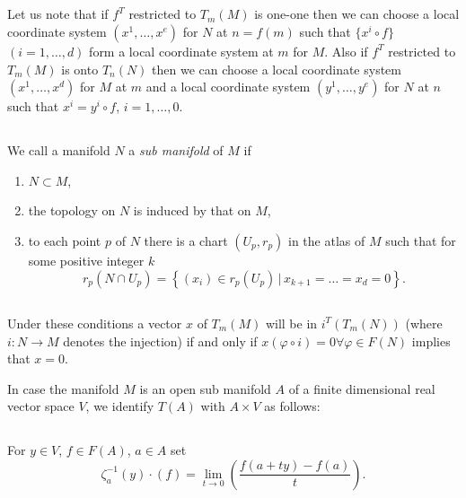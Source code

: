 \setcounter{section}{1}
\setcounter{subsection}{3}
\subsection{}\label{chap0:0.1.4}
Let us note that if $f^{T}$ restricted to $T_{m}(M)$ is one-one then
we can choose a local coordinate system $(x^{1},\ldots,x^{e})$ for $N$
at $n=f(m)$ such that $\{x^{i}\circ f\}$ $(i=1,\ldots,d)$ form a local
coordinate system at $m$ for $M$. Also if $f^{T}$ restricted to
$T_{m}(M)$ is onto $T_{n}(N)$ then we can choose a local coordinate
system $(x^{1},\ldots,x^{d})$ for $M$ at $m$ and a local coordinate
system $(y^{1},\ldots,y^{e})$ for $N$ at $n$ such that
$x^{i}=y^{i}\circ f$, $i=1,\ldots,0$.

\subsection{}\label{chap0:0.1.5}
We call a manifold $N$ a {\em sub manifold} of $M$ if 
\begin{enumerate}
\renewcommand{\labelenumi}{\theenumi)}
\item $N\subset M$,\pageoriginale

\item the topology on $N$ is induced by that on $M$,

\item to each point $p$ of $N$ there is a chart $(U_{p}, r_{p})$ in
  the atlas of $M$ such that for some positive integer $k$
$$
r_{p}(N\cap U_{p})=\left\{(x_{i})\in
r_{p}(U_{p})\,\big|\,x_{k+1}=\ldots=x_{d}=0\right\}.
$$
\end{enumerate}

\subsection{}\label{chap0:0.1.6}
Under these conditions a vector $x$ of $T_{m}(M)$ will be in
$i^{T}(T_{m}(N))$ (where $i:N\to M$ denotes the injection) if and only
if $x(\varphi\circ i)=0\forall \varphi\in F(N)$ implies that $x=0$.

In case the manifold $M$ is an open sub manifold $A$ of a finite
dimensional real vector space $V$, we identify $T(A)$ with $A\times V$
as follows:

\subsection{}\label{chap0:0.1.7}
For $y\in V$, $f\in F(A)$, $a\in A$ set
$$
\zeta^{-1}_{a}(y)\cdot (f)=\lim\limits_{t\to
  0}\left(\dfrac{f(a+ty)-f(a)}{t}\right).
$$

